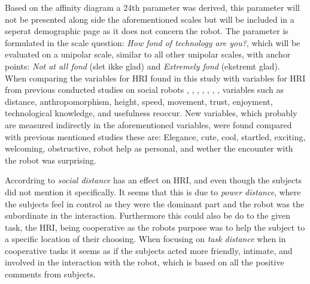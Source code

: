 \noindent
%
Based on the affinity diagram a 24th parameter was derived, this parameter will not be presented along side the aforementioned scales but will be included in a seperat demographic page as it does not concern the robot. The parameter is formulated in the scale question: \textit{How fond of technology are you?}, which will be evaluated on a unipolar scale, similar to all other unipolar scales, with anchor points: \textit{Not at all fond} (slet ikke glad) and \textit{Extremely fond} (ekstremt glad).\\  

\noindent
When comparing the variables for HRI found in this study with variables for HRI from previous conducted studies on social robots \cite{PDF:ExploringInfluencingVariable}, \cite{PDF:SharingALifeHarvey}, \cite{PDF:InTheCompanyofRobots}, \cite{PDF:CloseButNotStuck}, \cite{PDF:TheImpactOfTraveler}, \cite{PDF:HumanRobotEmodiedInteraction}, \cite{PDF:RecommendationEffects}, variables such as distance, anthropomorphism, height, speed, movement, trust, enjoyment, technological knowledge, and usefulness reoccur. New variables, which probably are measured indirectly in the aforementioned variables, were found compared with previous mentioned studies these are: Elegance, cute, cool, startled, exciting, welcoming, obstructive, robot help as personal, and wether the encounter with the robot was surprising. 

Accordring to \cite{PDF:HowSocialDistanceShapesHRI} \textit{social distance} has an effect on HRI, and even though the subjects did not mention it specifically. It seems that this is due to \textit{power distance}, where the subjects feel in control as they were the dominant part and the robot was the subordinate in the interaction. Furthermore this could also be do to the given task, the HRI, being cooperative as the robots purpose was to help the subject to a specific location of their choosing. When focusing on \textit{task distance} when in cooperative tasks it seems as if the subjects acted more friendly, intimate, and involved in the interaction with the robot, which is based on all the positive comments from subjects.       
 
  




